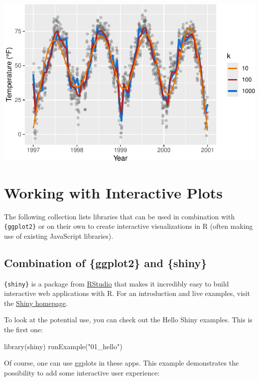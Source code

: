 \documentclass[
  letterpaper,
  DIV=11,
  numbers=noendperiod]{scrreprt}
\newenvironment{Shaded}{\begin{snugshade}}{\end{snugshade}}
\newcommand{\FunctionTok}[1]{\textcolor[rgb]{0.28,0.35,0.67}{#1}}
\newcommand{\NormalTok}[1]{\textcolor[rgb]{0.00,0.23,0.31}{#1}}
\newcommand{\StringTok}[1]{\textcolor[rgb]{0.13,0.47,0.30}{#1}}
\begin{document}
\includegraphics{ch17_files/figure-pdf/GAM-spec2-1.pdf}


\chapter{Working with Interactive Plots}\label{interactive}

The following collection lists libraries that can be used in combination
with \texttt{\{ggplot2\}} or on their own to create interactive
visualizations in R (often making use of existing JavaScript libraries).

\section{Combination of \{ggplot2\} and
\{shiny\}}\label{combination-of-ggplot2-and-shiny}

\texttt{\{shiny\}} is a package from
\href{https://rstudio.com/}{RStudio} that makes it incredibly easy to
build interactive web applications with R. For an introduction and live
examples, visit the \href{http://shiny.rstudio.com/}{Shiny homepage}.

To look at the potential use, you can check out the Hello Shiny
examples. This is the first one:

\begin{Shaded}
\begin{Highlighting}[]
\FunctionTok{library}\NormalTok{(shiny)}
\FunctionTok{runExample}\NormalTok{(}\StringTok{"01\_hello"}\NormalTok{)}
\end{Highlighting}
\end{Shaded}

Of course, one can use ggplots in these apps. This example demonstrates
the possibility to add some interactive user experience:
\end{document}
